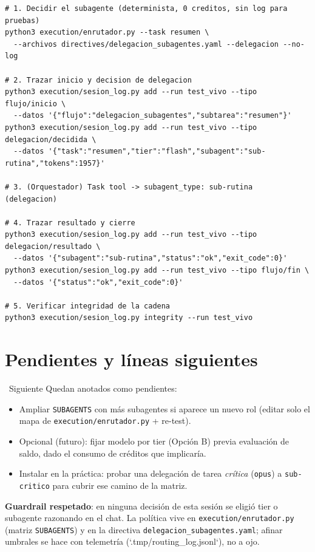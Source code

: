 \documentclass[11pt,a4paper]{article}
\newcommand{\iconotexto}[2]{\textcolor{cyanNeon}{\faIcon{#1}}~#2}
\begin{document}
\begin{lstlisting}[style=estiloPython]
# 1. Decidir el subagente (determinista, 0 creditos, sin log para pruebas)
python3 execution/enrutador.py --task resumen \
  --archivos directives/delegacion_subagentes.yaml --delegacion --no-log

# 2. Trazar inicio y decision de delegacion
python3 execution/sesion_log.py add --run test_vivo --tipo flujo/inicio \
  --datos '{"flujo":"delegacion_subagentes","subtarea":"resumen"}'
python3 execution/sesion_log.py add --run test_vivo --tipo delegacion/decidida \
  --datos '{"task":"resumen","tier":"flash","subagent":"sub-rutina","tokens":1957}'

# 3. (Orquestador) Task tool -> subagent_type: sub-rutina  (delegacion)

# 4. Trazar resultado y cierre
python3 execution/sesion_log.py add --run test_vivo --tipo delegacion/resultado \
  --datos '{"subagent":"sub-rutina","status":"ok","exit_code":0}'
python3 execution/sesion_log.py add --run test_vivo --tipo flujo/fin \
  --datos '{"status":"ok","exit_code":0}'

# 5. Verificar integridad de la cadena
python3 execution/sesion_log.py integrity --run test_vivo
\end{lstlisting}

\section{Pendientes y líneas siguientes}

\iconotexto{road}{Siguiente} Quedan anotados como pendientes:

\begin{itemize}[leftmargin=16pt, itemsep=2pt, topsep=2pt]
  \item Ampliar \texttt{SUBAGENTS} con más subagentes si aparece un nuevo rol
        (editar solo el mapa de \texttt{execution/enrutador.py} + re-test).
  \item Opcional (futuro): fijar modelo por tier (Opción B) previa evaluación de saldo,
        dado el consumo de créditos que implicaría.
  \item Instalar en la práctica: probar una delegación de tarea \emph{crítica}
        (\texttt{opus}) a \texttt{sub-critico} para cubrir ese camino de la matriz.
\end{itemize}

\begin{tcolorbox}[cajaConcepto]
\textbf{Guardrail respetado}: en ninguna decisión de esta sesión se eligió tier o
subagente razonando en el chat. La política vive en \texttt{execution/enrutador.py}
(matriz \texttt{SUBAGENTS}) y en la directiva \texttt{delegacion\_subagentes.yaml};
afinar umbrales se hace con telemetría (`.tmp/routing\_log.jsonl`), no a ojo.
\end{tcolorbox}
\end{document}
